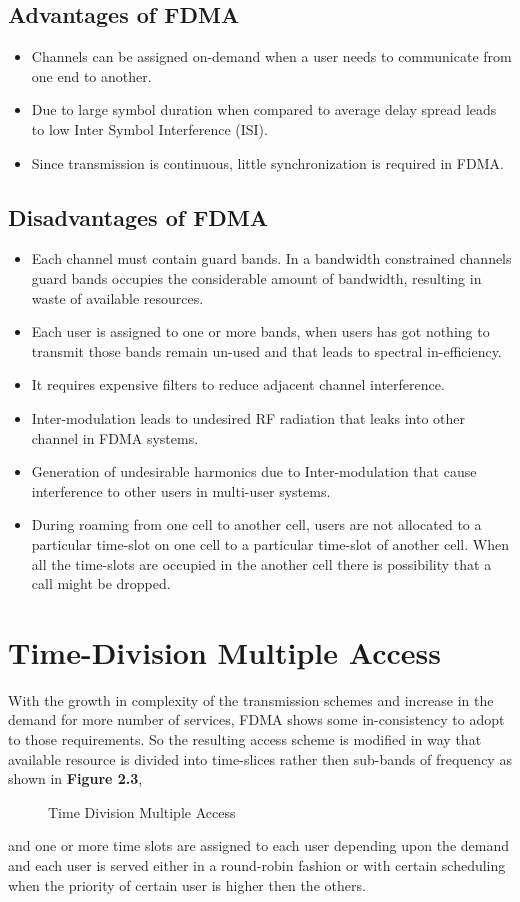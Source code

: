 \subsection{Advantages of FDMA}
\begin{itemize}
\item Channels can be assigned on-demand when a user needs to communicate from one end to another.
\item Due to large symbol duration when compared to average delay spread leads to low Inter Symbol Interference (ISI).
\item Since transmission is continuous, little synchronization is required in FDMA.
\end{itemize}
\subsection{Disadvantages of FDMA}
\begin{itemize}
\item Each channel must contain guard bands. In a bandwidth constrained channels guard bands occupies the considerable amount of bandwidth, resulting in waste of available resources.
\item Each user is assigned to one or more bands, when users has got nothing to transmit those bands remain un-used and that leads to spectral in-efficiency.
\item It requires expensive filters to reduce adjacent channel interference.
\item Inter-modulation leads to undesired RF radiation that leaks into other channel in FDMA systems.
\item Generation of undesirable harmonics due to Inter-modulation that cause interference to other users in multi-user systems.
\item During roaming from one cell to another cell, users are not allocated to a particular time-slot on one cell to a particular time-slot of another cell. When all the time-slots are occupied in the another cell there is possibility that a call might be dropped.
\end{itemize}
\section{Time-Division Multiple Access}
With the growth in complexity of the transmission schemes and increase in the demand for more number of services, FDMA shows some in-consistency to adopt to those requirements. So the resulting access scheme is modified in way that available resource is divided into time-slices rather then sub-bands of frequency as shown in \textbf{Figure 2.3}, 
\begin{figure}[htb]
  \centerline{  }
  \caption{Time Division Multiple Access}
\end{figure}
and one or more time slots are assigned to each user depending upon the demand and each user is served either in a round-robin fashion or with certain scheduling when the priority of certain user is higher then the others.
